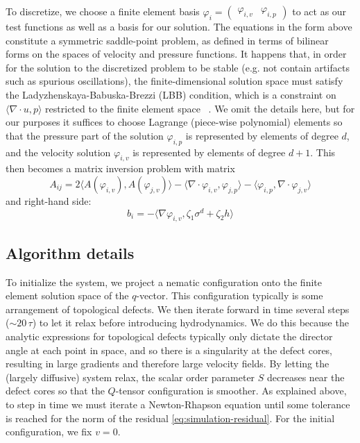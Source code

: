 \documentclass[reqno]{article}
\begin{document}
  To discretize, we choose a finite element basis $\varphi_i
  = \begin{pmatrix} \varphi_{i, v} &\varphi_{i, p} \end{pmatrix}$ to act
  as our test functions as well as a basis for our solution.
  The equations in the form above constitute a symmetric saddle-point problem,
  as defined in terms of bilinear forms on the spaces of velocity and pressure
  functions.
  It happens that, in order for the solution to the discretized problem to be
  stable (e.g. not contain artifacts such as spurious oscillations), the
  finite-dimensional solution space must satisfy the
  Ladyzhenskaya-Babuska-Brezzi (LBB) condition, which is a constraint on
  $\langle \nabla \cdot u, p \rangle$ restricted to the finite element space ~\cite{boffi_mixed_2013}.
  We omit the details here, but for our purposes it suffices to choose Lagrange (piece-wise polynomial)
  elements so that the pressure part of the solution $\varphi_{i, p}$ is
  represented by elements of degree $d$, and the velocity solution $\varphi_{i, v}$ is
  represented by elements of degree $d + 1$.
  This then becomes a matrix inversion problem with matrix
  \begin{equation}
    A_{ij}
    =
    2 \langle A(\varphi_{i, v}), A(\varphi_{j, v}) \rangle
    - \langle \nabla \cdot \varphi_{i, v}, \varphi_{j, p} \rangle
    - \langle \varphi_{i, p}, \nabla \cdot \varphi_{j, v} \rangle
  \end{equation}
  and right-hand side:
  \begin{equation}
    b_i
    =
    - \langle \nabla \varphi_{i, v}, \zeta_1 \sigma^d + \zeta_2 h \rangle
  \end{equation}

  \subsection{Algorithm details} \label{algorithm-details}
  To initialize the system, we project a nematic configuration onto the finite
  element solution space of the $q$-vector.
  This configuration typically is some arrangement of topological defects.
  We then iterate forward in time several steps ($\sim 20 \, \tau$) to let it
  relax before introducing hydrodynamics.
  We do this because the analytic expressions for topological defects typically
  only dictate the director angle at each point in space, and so there is a
  singularity at the defect cores, resulting in large gradients and therefore
  large velocity fields.
  By letting the (largely diffusive) system relax, the scalar order parameter
  $S$ decreases near the defect cores so that the $Q$-tensor configuration is
  smoother.
  As explained above, to step in time we must iterate a Newton-Rhapson equation
  until some tolerance is reached for the norm of the residual \eqref{eq:simulation-residual}.
  For the initial configuration, we fix $v = 0$.
\end{document}
